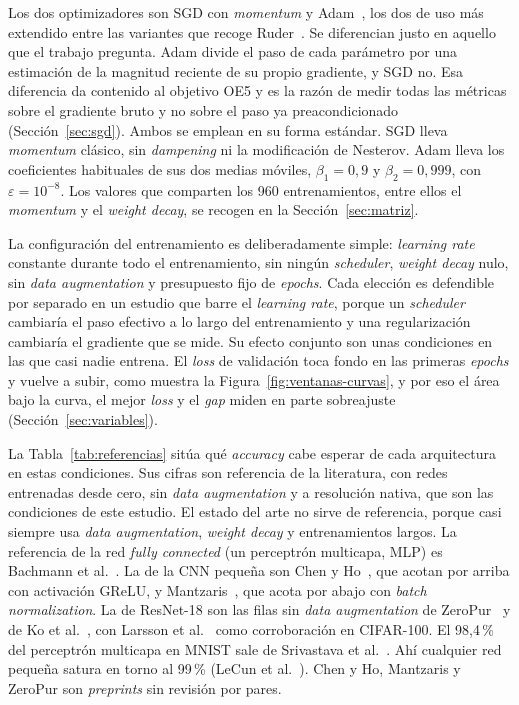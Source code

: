 Los dos optimizadores son SGD con \emph{momentum} y Adam~\cite{kingma2015adam}, los dos de uso más extendido entre las variantes que recoge Ruder~\cite{ruder2016overview}. Se diferencian justo en aquello que el trabajo pregunta. Adam divide el paso de cada parámetro por una estimación de la magnitud reciente de su propio gradiente, y SGD no. Esa diferencia da contenido al objetivo OE5 y es la razón de medir todas las métricas sobre el gradiente bruto y no sobre el paso ya preacondicionado (Sección~\ref{sec:sgd}). Ambos se emplean en su forma estándar. SGD lleva \emph{momentum} clásico, sin \emph{dampening} ni la modificación de Nesterov. Adam lleva los coeficientes habituales de sus dos medias móviles, $\beta_1 = 0{,}9$ y $\beta_2 = 0{,}999$, con $\varepsilon = 10^{-8}$. Los valores que comparten los 960 entrenamientos, entre ellos el \emph{momentum} y el \emph{weight decay}, se recogen en la Sección~\ref{sec:matriz}.

La configuración del entrenamiento es deliberadamente simple: \emph{learning rate} constante durante todo el entrenamiento, sin ningún \emph{scheduler}, \emph{weight decay} nulo, sin \emph{data augmentation} y presupuesto fijo de \emph{epochs}. Cada elección es defendible por separado en un estudio que barre el \emph{learning rate}, porque un \emph{scheduler} cambiaría el paso efectivo a lo largo del entrenamiento y una regularización cambiaría el gradiente que se mide. Su efecto conjunto son unas condiciones en las que casi nadie entrena. El \emph{loss} de validación toca fondo en las primeras \emph{epochs} y vuelve a subir, como muestra la Figura~\ref{fig:ventanas-curvas}, y por eso el área bajo la curva, el mejor \emph{loss} y el \emph{gap} miden en parte sobreajuste (Sección~\ref{sec:variables}).

La Tabla~\ref{tab:referencias} sitúa qué \emph{accuracy} cabe esperar de cada arquitectura en estas condiciones. Sus cifras son referencia de la literatura, con redes entrenadas desde cero, sin \emph{data augmentation} y a resolución nativa, que son las condiciones de este estudio. El estado del arte no sirve de referencia, porque casi siempre usa \emph{data augmentation}, \emph{weight decay} y entrenamientos largos. La referencia de la red \emph{fully connected} (un perceptrón multicapa, MLP) es Bachmann et al.~\cite{bachmann2023scaling}. La de la CNN pequeña son Chen y Ho~\cite{chen2018deep}, que acotan por arriba con activación GReLU, y Mantzaris~\cite{mantzaris2025exploring}, que acota por abajo con \emph{batch normalization}. La de ResNet-18 son las filas sin \emph{data augmentation} de ZeroPur~\cite{liu2024zeropur} y de Ko et al.~\cite{ko2024learning}, con Larsson et al.~\cite{larsson2017fractalnet} como corroboración en CIFAR-100. El 98,4\,\% del perceptrón multicapa en MNIST sale de Srivastava et al.~\cite{srivastava2014dropout}. Ahí cualquier red pequeña satura en torno al 99\,\% (LeCun et al.~\cite{lecun1998gradient}). Chen y Ho, Mantzaris y ZeroPur son \emph{preprints} sin revisión por pares.


